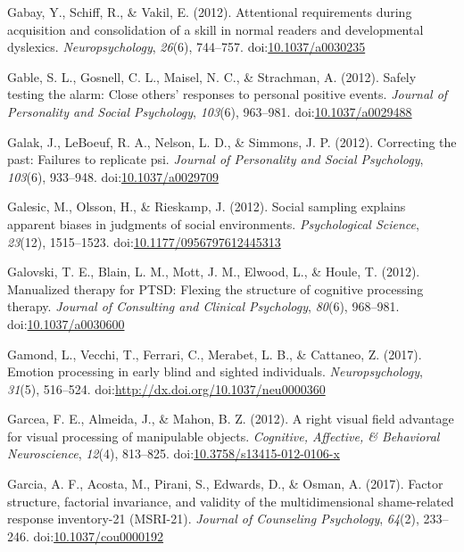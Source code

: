 \documentclass[english,man]{apa6}
\theoremstyle{definition}
\theoremstyle{definition}
\theoremstyle{definition}
\theoremstyle{remark}
\begin{document}
\hypertarget{ref-Gabay2012}{}
Gabay, Y., Schiff, R., \& Vakil, E. (2012). Attentional requirements
during acquisition and consolidation of a skill in normal readers and
developmental dyslexics. \emph{Neuropsychology}, \emph{26}(6), 744--757.
doi:\href{https://doi.org/10.1037/a0030235}{10.1037/a0030235}

\hypertarget{ref-Gable2012}{}
Gable, S. L., Gosnell, C. L., Maisel, N. C., \& Strachman, A. (2012).
Safely testing the alarm: Close others' responses to personal positive
events. \emph{Journal of Personality and Social Psychology},
\emph{103}(6), 963--981.
doi:\href{https://doi.org/10.1037/a0029488}{10.1037/a0029488}

\hypertarget{ref-Galak2012}{}
Galak, J., LeBoeuf, R. A., Nelson, L. D., \& Simmons, J. P. (2012).
Correcting the past: Failures to replicate psi. \emph{Journal of
Personality and Social Psychology}, \emph{103}(6), 933--948.
doi:\href{https://doi.org/10.1037/a0029709}{10.1037/a0029709}

\hypertarget{ref-Galesic2012}{}
Galesic, M., Olsson, H., \& Rieskamp, J. (2012). Social sampling
explains apparent biases in judgments of social environments.
\emph{Psychological Science}, \emph{23}(12), 1515--1523.
doi:\href{https://doi.org/10.1177/0956797612445313}{10.1177/0956797612445313}

\hypertarget{ref-Galovski2012}{}
Galovski, T. E., Blain, L. M., Mott, J. M., Elwood, L., \& Houle, T.
(2012). Manualized therapy for PTSD: Flexing the structure of cognitive
processing therapy. \emph{Journal of Consulting and Clinical
Psychology}, \emph{80}(6), 968--981.
doi:\href{https://doi.org/10.1037/a0030600}{10.1037/a0030600}

\hypertarget{ref-Gamond2017}{}
Gamond, L., Vecchi, T., Ferrari, C., Merabet, L. B., \& Cattaneo, Z.
(2017). Emotion processing in early blind and sighted individuals.
\emph{Neuropsychology}, \emph{31}(5), 516--524.
doi:\href{https://doi.org/http://dx.doi.org/10.1037/neu0000360}{http://dx.doi.org/10.1037/neu0000360}

\hypertarget{ref-Garcea2012}{}
Garcea, F. E., Almeida, J., \& Mahon, B. Z. (2012). A right visual field
advantage for visual processing of manipulable objects. \emph{Cognitive,
Affective, \& Behavioral Neuroscience}, \emph{12}(4), 813--825.
doi:\href{https://doi.org/10.3758/s13415-012-0106-x}{10.3758/s13415-012-0106-x}

\hypertarget{ref-Garcia2017}{}
Garcia, A. F., Acosta, M., Pirani, S., Edwards, D., \& Osman, A. (2017).
Factor structure, factorial invariance, and validity of the
multidimensional shame-related response inventory-21 (MSRI-21).
\emph{Journal of Counseling Psychology}, \emph{64}(2), 233--246.
doi:\href{https://doi.org/10.1037/cou0000192}{10.1037/cou0000192}
\end{document}
